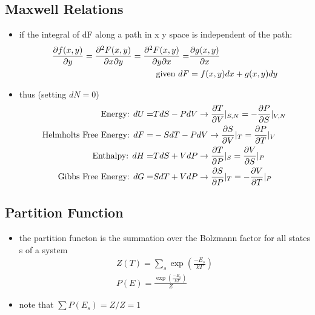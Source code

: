 \subsection{Maxwell Relations}
\begin{itemize}
	\item if the integral of dF along a path in x y space is independent of the path:
	      \begin{align*}
		      \pdv{f(x,y)}{y} = \pdv{F(x,y)}{x}{y} = \pdv{F(x,y)}{y}{x} = & \pdv{g(x,y)}{x}       \\
		      \text{given } dF                                            & = f(x,y)dx + g(x,y)dy
	      \end{align*}
	\item thus (setting $dN = 0$)
	      \begin{align*}
		      \text{Energy: } dU =                & T dS - PdV \rightarrow \pdv{T}{V}|_{S,N} = - \pdv{P}{S}|_{V,N} \\
		      \text{Helmholts Free Energy: } dF = & -S dT - P dV \rightarrow \pdv{S}{V}|_T = \pdv{P}{T}|_V         \\
		      \text{Enthalpy: } dH =              & T dS + V dP \rightarrow \pdv{T}{P}|_S = \pdv{V}{S}|_P          \\
		      \text{Gibbs Free Energy: } dG =     & S dT + V dP  \rightarrow \pdv{S}{P}|_T = - \pdv{V}{T}|_P
	      \end{align*}

\end{itemize}

\subsection{Partition Function}
\begin{itemize}
	\item the partition functon is the summation over the Bolzmann factor for all states s of a system 
	\begin{align}
		Z(T) = \sum_s \exp(\frac{-E_s}{kT}) \\
		P(E) = \frac{\exp(\frac{-E_s}{kT})} {Z}
	\end{align}
	\item note that $\sum P(E_s) = Z/Z = 1$
\end{itemize}